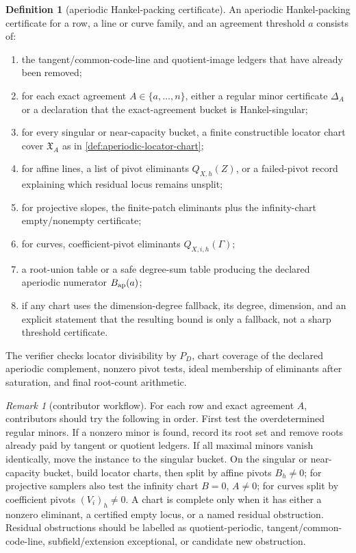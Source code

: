 \documentclass[11pt]{article}
\theoremstyle{definition}
\newtheorem{definition}[definition]{Definition}
\theoremstyle{remark}
\newtheorem{remark}[remark]{Remark}
\begin{document}
\begin{definition}[aperiodic Hankel-packing certificate]
\label{def:aperiodic-hankel-certificate}
An aperiodic Hankel-packing certificate for a row, a line or curve family, and an
agreement threshold $a$ consists of:
\begin{enumerate}[label=\textup{(\roman*)},leftmargin=2.2em]
\item the tangent/common-code-line and quotient-image ledgers that have already
been removed;
\item for each exact agreement $A\in\{a,\ldots,n\}$, either a regular minor
certificate $\Delta_A$ or a declaration that the exact-agreement bucket is
Hankel-singular;
\item for every singular or near-capacity bucket, a finite constructible locator
chart cover $\mathfrak X_A$ as in \cref{def:aperiodic-locator-chart};
\item for affine lines, a list of pivot eliminants $Q_{X,h}(Z)$, or a failed-pivot
record explaining which residual locus remains unsplit;
\item for projective slopes, the finite-patch eliminants plus the infinity-chart
empty/nonempty certificate;
\item for curves, coefficient-pivot eliminants $Q_{X,i,h}(\Gamma)$;
\item a root-union table or a safe degree-sum table producing the declared
aperiodic numerator $B_{\rm ap}(a)$;
\item if any chart uses the dimension-degree fallback, its degree, dimension, and
an explicit statement that the resulting bound is only a fallback, not a sharp
threshold certificate.
\end{enumerate}
The verifier checks locator divisibility by $P_D$, chart coverage of the declared
aperiodic complement, nonzero pivot tests, ideal membership of eliminants after
saturation, and final root-count arithmetic.
\end{definition}

\begin{remark}[contributor workflow]
\label{rem:aperiodic-contributor-workflow}
For each row and exact agreement $A$, contributors should try the following in
order.  First test the overdetermined regular minors.  If a nonzero minor is
found, record its root set and remove roots already paid by tangent or quotient
ledgers.  If all maximal minors vanish identically, move the instance to the
singular bucket.  On the singular or near-capacity bucket, build locator charts,
then split by affine pivots $B_h\ne0$; for projective samplers also test the
infinity chart $B=0$, $A\ne0$; for curves split by coefficient pivots
$(V_i)_h\ne0$.  A chart is complete only when it has either a nonzero eliminant,
a certified empty locus, or a named residual obstruction.  Residual obstructions
should be labelled as quotient-periodic, tangent/common-code-line,
subfield/extension exceptional, or candidate new obstruction.
\end{remark}
\end{document}
